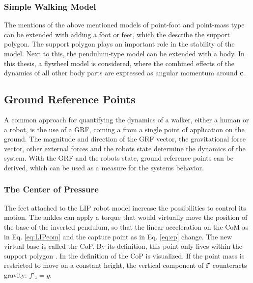 \subsubsection{Simple Walking Model}
The mentions of the above mentioned models of point-foot and point-mass type can be extended with adding a foot or feet, which the describe the support polygon. The support polygon plays an important role in the stability of the model. Next to this, the pendulum-type model can be extended with a body. In this thesis, a flywheel model is considered, where the combined effects of the dynamics of all other body parts are expressed as angular momentum around $\mathbf{c}$.


\subsection{Ground Reference Points}\label{sec:grp}
A common approach for quantifying the dynamics of a walker, either a human or a robot, is the use of a \ac{GRF}, coming a from a single point of application on the ground. The magnitude and direction of the \ac{GRF} vector, the gravitational force vector, other external forces and the robots state determine the dynamics of the system. With the \ac{GRF} and the robots state, ground reference points can be derived, which can be used as a measure for the systems behavior.

\subsubsection{The Center of Pressure}
The feet attached to the \ac{LIP} robot model increase the possibilities to control its motion. The ankles can apply a torque that would virtually move the position of the base of the inverted pendulum, so that the linear acceleration on the \ac{CoM} as in Eq. \eqref{eq:LIPeom} and the capture point as in Eq. \eqref{eq:cp} change. The new virtual base is called the \ac{CoP}. By its definition, this point only lives within the support polygon \cite{vukobratovic2004zero}. In  the definition of the \ac{CoP} is visualized. If the point mass is restricted to move on a constant height, the vertical component of $\boldsymbol{f'}$ counteracts gravity: $f'_z=g$. 


